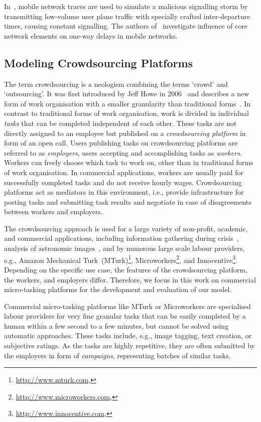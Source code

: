 In~\cite{Lee2007}, mobile network traces are used to simulate a malicious signalling storm by transmitting low-volume user plane traffic with specially crafted inter-departure times, causing constant signalling.
The authors of~\cite{Romirer-Maierhofer2008} investigate influence of core network elements on one-way delays in mobile networks.

\subsection{Modeling Crowdsourcing Platforms}
The term crowdsourcing is a neologism combining the terms `crowd' and `outsourcing'.
It was first introduced by Jeff Howe in 2006~\cite{Howe2006} and describes a new form of work organisation with a smaller granularity than traditional forms~\cite{Hossfeld2011c}.
In contrast to traditional forms of work organisation, work is divided in individual \emph{tasks} that can be completed independent of each other.
These tasks are not directly assigned to an employee but published on a \emph{crowdsourcing platform} in form of an open call.
Users publishing tasks on crowdsourcing platforms are referred to as \emph{employers}, users accepting and accomplishing tasks as \emph{workers}.
Workers can freely choose which task to work on, other than in traditional forms of work organisation.
In commercial applications, workers are usually paid for successfully completed tasks and do not receive hourly wages.
Crowdsourcing platforms act as mediators in this environment, i.e., provide infrastructure for posting tasks and submitting task results and negotiate in case of disagreements between workers and employers.

The crowdsourcing approach is used for a large variety of non-profit, academic, and commercial applications, including information gathering during crisis~\cite{Morrow2011}, analysis of astronomic images~\cite{Raddick2010}, and by numerous large scale labour providers, e.g., Amazon Mechanical Turk~(MTurk)\footnote{\url{http://www.mturk.com}, \accessed}, Microworkers\footnote{\url{http://www.microworkers.com}, \accessed}, and Innocentive\footnote{\url{http://www.innocentive.com}, \accessed}.
Depending on the specific use case, the features of the crowdsourcing platform, the workers, and employers differ.
Therefore, we focus in this work on commercial micro-tasking platforms for the development and evaluation of our model.

Commercial micro-tasking platforms like MTurk or Microworkers are specialised labour providers for very fine granular tasks that can be easily completed by a human within a few second to a few minutes, but cannot be solved using automatic approaches. 
These tasks include, e.g., image tagging, text creation, or subjective ratings.
As the tasks are highly repetitive, they are often submitted by the employers in form of \emph{campaigns}, representing batches of similar tasks.

